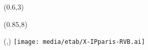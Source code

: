 \begin{textblock}{1}(0.6,3)
    \textblockcolour{} 
	\Large{}
\end{textblock}

\begin{textblock}{1}(0.85,8)
    \textblockcolour{} 
\end{textblock}


                            


\begin{textblock}{1}(\hpos,\vpos)
	\texttt{[image: media/etab/X-IPparis-RVB.ai]}
\end{textblock}

